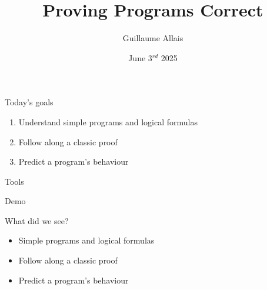 \documentclass[3to2]{beamer}
\begin{document}
\title{Proving Programs Correct}
\author{Guillaume Allais}
\date{June 3$^{rd}$ 2025}

\begin{frame}
  \maketitle
\end{frame}

\begin{frame}{Today's goals}
  \begin{enumerate}
    \item Understand simple programs and logical formulas
    \item Follow along a classic proof
    \item Predict a program's behaviour
  \end{enumerate}
\end{frame}




\begin{frame}{Tools}
\begin{center}
\Huge
Demo
\end{center}
\end{frame}

\begin{frame}{What did we see?}

  \begin{itemize}
    \item Simple programs and logical formulas
    \item Follow along a classic proof
    \item Predict a program's behaviour
  \end{itemize}
\end{frame}
\end{document}
